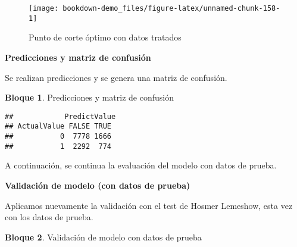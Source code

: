 \documentclass[
]{book}
\newenvironment{Shaded}{\begin{snugshade}}{\end{snugshade}}
\newcommand{\AttributeTok}[1]{\textcolor[rgb]{0.77,0.63,0.00}{#1}}
\newcommand{\CommentTok}[1]{\textcolor[rgb]{0.56,0.35,0.01}{\textit{#1}}}
\newcommand{\DecValTok}[1]{\textcolor[rgb]{0.00,0.00,0.81}{#1}}
\newcommand{\FunctionTok}[1]{\textcolor[rgb]{0.00,0.00,0.00}{#1}}
\newcommand{\NormalTok}[1]{#1}
\newcommand{\OtherTok}[1]{\textcolor[rgb]{0.56,0.35,0.01}{#1}}
\newcommand{\SpecialCharTok}[1]{\textcolor[rgb]{0.00,0.00,0.00}{#1}}
\newcommand{\StringTok}[1]{\textcolor[rgb]{0.31,0.60,0.02}{#1}}
\theoremstyle{definition}
\theoremstyle{definition}
\newtheorem{example}{Bloque}[chapter]
\theoremstyle{definition}
\theoremstyle{definition}
\theoremstyle{remark}
\begin{document}
\begin{figure}
\texttt{[image: bookdown-demo\_files/figure-latex/unnamed-chunk-158-1]} \caption{Punto de corte óptimo con datos tratados}\label{fig:unnamed-chunk-158}
\end{figure}

\textbf{Predicciones y matriz de confusión}

Se realizan predicciones y se genera una matriz de confusión.

\begin{example}
\protect\hypertarget{exm:bloque86nbm}{}\label{exm:bloque86nbm}Predicciones y matriz de confusión
\end{example}

\begin{Shaded}
\end{Shaded}

\begin{verbatim}
##            PredictValue
## ActualValue FALSE TRUE
##           0  7778 1666
##           1  2292  774
\end{verbatim}

A continuación, se continua la evaluación del modelo con datos de prueba.

\textbf{Validación de modelo (con datos de prueba)}

Aplicamos nuevamente la validación con el test de Hosmer Lemeshow, esta vez con los datos de prueba.

\begin{example}
\protect\hypertarget{exm:bloque87nbm}{}\label{exm:bloque87nbm}Validación de modelo con datos de prueba
\end{example}

\begin{Shaded}
\end{Shaded}
\end{document}
